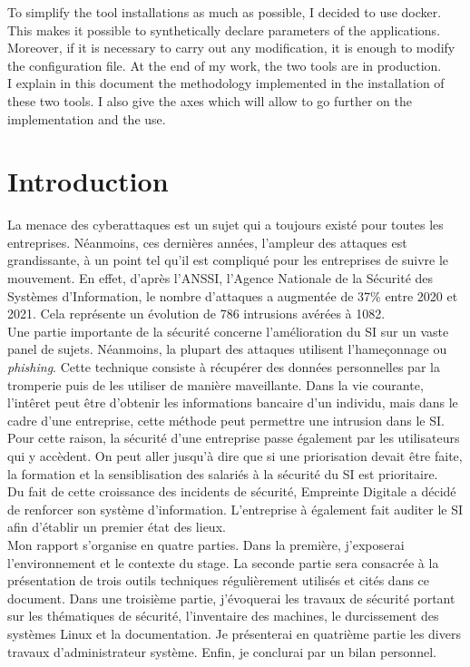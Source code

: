 \documentclass[12pt, a4paper, twoside]{article}
\begin{document}
To simplify the tool installations as much as possible, I decided to use docker.
This makes it possible to synthetically declare parameters of the applications. 
Moreover, if it is necessary to carry out any modification, it is enough to modify the configuration file. 
At the end of my work, the two tools are in production. \\

I explain in this document the methodology implemented in the installation of these two tools.
I also give the axes which will allow to go further on the implementation and the use.

\newpage
\section*{Introduction}
La menace des cyberattaques est un sujet qui a toujours existé pour toutes les entreprises.
Néanmoins, ces dernières années, l'ampleur des attaques est grandissante, à un point tel qu'il est compliqué pour les entreprises de suivre le mouvement.
En effet, d'après l'\gls{ANSSI}, l'Agence Nationale de la Sécurité des Systèmes d'Information, le nombre d'attaques a augmentée de 37\% entre 2020 et 2021.
Cela représente un évolution de 786 intrusions avérées à 1082. \\

Une partie importante de la sécurité concerne l'amélioration du SI sur un vaste panel de sujets.
Néanmoins, la plupart des attaques utilisent l'hameçonnage ou \textit{phishing}.
Cette technique consiste à récupérer des données personnelles par la tromperie puis de les utiliser de manière maveillante.
Dans la vie courante, l'intêret peut être d'obtenir les informations bancaire d'un individu, mais dans le cadre d'une entreprise, cette méthode peut permettre une intrusion dans le \gls{SI}.
Pour cette raison, la sécurité d'une entreprise passe également par les utilisateurs qui y accèdent.
On peut aller jusqu'à dire que si une priorisation devait être faite, la formation et la sensiblisation des salariés à la sécurité du \gls{SI} est prioritaire.\\

Du fait de cette croissance des incidents de sécurité, Empreinte Digitale a décidé de renforcer son système d'information.
L'entreprise à également fait auditer le \gls{SI} afin d'établir un premier état des lieux. \\

Mon rapport s'organise en quatre parties. 
Dans la première, j'exposerai l'environnement et le contexte du stage. 
La seconde partie sera consacrée à la présentation de trois outils techniques régulièrement utilisés et cités dans ce document. 
Dans une troisième partie, j'évoquerai les travaux de sécurité portant sur les thématiques de sécurité, l'inventaire des machines, le durcissement des systèmes \gls{Linux} et la documentation. 
Je présenterai en quatrième partie les divers travaux d'administrateur système. 
Enfin, je conclurai par un bilan personnel.\\
\end{document}
